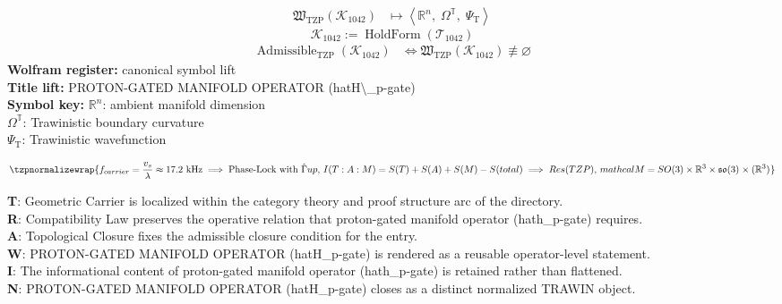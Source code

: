 \noindent
\begin{minipage}[t]{0.48\linewidth}
\begingroup
\small
\[
\begin{aligned}
\mathfrak{W}_{\mathrm{TZP}}\!\left(\mathcal{K}_{1042}\right)
&\longmapsto
\left\langle \mathbb{R}^{n},\; \Omega^{\mathbb{T}},\; \Psi_{\mathrm{T}} \right\rangle
\end{aligned}
\]
\[
\mathcal{K}_{1042}
:=
\operatorname{HoldForm}\!\left(\mathcal{T}_{1042}\right)
\]
\[
\begin{aligned}
\operatorname{Admissible}_{\mathrm{TZP}}\!\left(\mathcal{K}_{1042}\right)
&\Longleftrightarrow
\mathfrak{W}_{\mathrm{TZP}}\!\left(\mathcal{K}_{1042}\right)\not\equiv\varnothing
\end{aligned}
\]
\textbf{Wolfram register:} canonical symbol lift\\
\textbf{Title lift:} PROTON-GATED MANIFOLD OPERATOR (hatH\textbackslash{}\_p-gate)\\
\textbf{Symbol key:} \(\mathbb{R}^{n}\): ambient manifold dimension\\ \(\Omega^{\mathbb{T}}\): Trawinistic boundary curvature\\ \(\Psi_{\mathrm{T}}\): Trawinistic wavefunction
\par
\endgroup
\end{minipage}\hfill
\begin{minipage}[t]{0.48\linewidth}
\[
\tzpnormalizewrap{f_{carrier} = \frac{v_s}{\lambda} \approx 17.2 \text{ kHz} \implies \text{Phase-Lock with } \hat{\Gamma} {up},\,I(T:A:M) = S(T) + S(A) + S(M) - S(total) \implies Res(TZP),\,mathcal{M}=SO(3)\times\mathbb{R}^{3}\times\mathfrak{so}(3)^{ }\times(\mathbb{R}^{3})^{ }}
\]

\small
\textbf{T}: Geometric Carrier is localized within the category theory and proof structure arc of the directory.\\
\textbf{R}: Compatibility Law preserves the operative relation that proton-gated manifold operator (hath\_p-gate) requires.\\
\textbf{A}: Topological Closure fixes the admissible closure condition for the entry.\\
\textbf{W}: PROTON-GATED MANIFOLD OPERATOR (hatH\_p-gate) is rendered as a reusable operator-level statement.\\
\textbf{I}: The informational content of proton-gated manifold operator (hath\_p-gate) is retained rather than flattened.\\
\textbf{N}: PROTON-GATED MANIFOLD OPERATOR (hatH\_p-gate) closes as a distinct normalized TRAWIN object.
\normalsize
\end{minipage}

